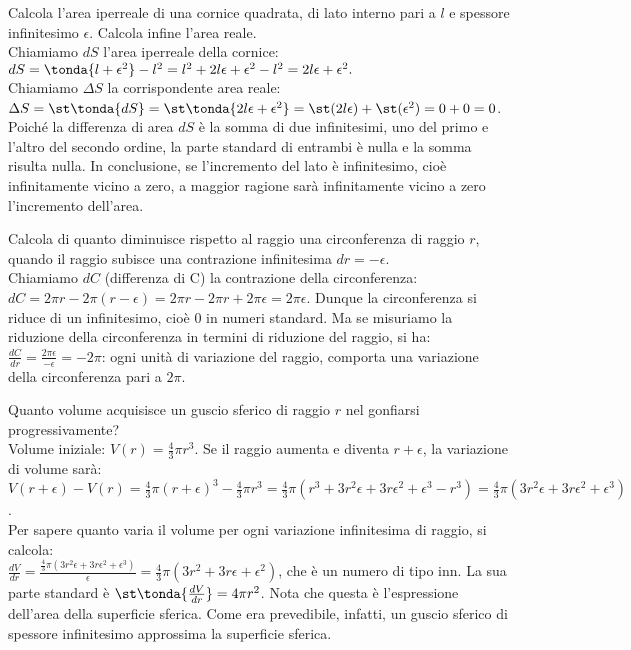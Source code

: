 \begin{esempio}
Calcola l'area iperreale di una cornice quadrata, di lato interno pari a 
\(l\) e
spessore infinitesimo \(\epsilon\). Calcola infine l'area reale.\\
Chiamiamo \(dS\) l'area iperreale della cornice:
\(dS=\tonda{l+\epsilon^2}
-l^2=l^2+2l\epsilon+\epsilon^2-l^2=2l\epsilon+\epsilon^2.\)\\
Chiamiamo \(\Delta S\) la corrispondente area reale:
\(\Delta S=\st\tonda{dS}=\st\tonda{2l\epsilon+\epsilon^2}=
\st(2l\epsilon)+\st(\epsilon^2)=0+0=0\).\\
Poiché la differenza di area \(dS\) è la somma di due infinitesimi, uno del 
primo e 
l'altro del secondo ordine, la parte standard di entrambi è nulla e la 
somma 
risulta nulla. In conclusione, se l'incremento del lato è infinitesimo,
cioè infinitamente vicino a zero, a maggior ragione sarà infinitamente 
vicino
a zero l'incremento dell'area.
\end{esempio}

\begin{esempio}
Calcola di quanto diminuisce rispetto al raggio una circonferenza di raggio 
\(r\),
quando il raggio subisce una contrazione infinitesima \(dr=-\epsilon\).\\
Chiamiamo \(dC\) (differenza di C) la contrazione della circonferenza:
\(dC=2\pi r-2\pi (r-\epsilon)=2\pi r-2\pi r+2\pi \epsilon= 2\pi \epsilon\).
Dunque la circonferenza si riduce di un infinitesimo, cioè \(0\) in numeri 
standard.
Ma se misuriamo la riduzione della circonferenza in termini
di riduzione del raggio, si ha:
\(\frac{dC}{dr}=\frac{2\pi \epsilon}{-\epsilon}=-2\pi\): ogni unità di 
variazione 
del raggio, comporta una variazione della circonferenza pari a \(2\pi\).
\end{esempio}

\begin{esempio}
Quanto volume acquisisce un guscio sferico di raggio \(r\) nel gonfiarsi
progressivamente?\\
Volume iniziale: \(V(r)=\frac{4}{3}\pi r^3\). Se il raggio aumenta e diventa 
\(r+\epsilon\), 
la variazione di volume sarà:\\
\(V(r+\epsilon)-V(r)=\frac{4}{3}\pi (r+\epsilon)^3-\frac{4}{3}\pi r^3=
\frac{4}{3}\pi (r^3+3r^2\epsilon+3r\epsilon^2+\epsilon^3-r^3)=
\frac{4}{3}\pi (3r^2\epsilon+3r\epsilon^2+\epsilon^3)\).\\
Per sapere quanto varia il volume per ogni variazione infinitesima di 
raggio, si calcola:\\
\(\frac{dV}{dr}=\frac{\frac{4}{3}\pi 
(3r^2\epsilon+3r\epsilon^2+\epsilon^3)}{\epsilon}=
\frac{4}{3}\pi (3r^2+3r\epsilon+\epsilon^2)\), che è un numero di tipo inn.
La sua parte standard è \(\st\tonda{\frac{dV}{dr}}=4\pi r^2\). Nota che questa
è l'espressione dell'area della superficie sferica. Come era prevedibile, 
infatti, 
un guscio sferico di spessore infinitesimo approssima la superficie sferica.
\end{esempio}

